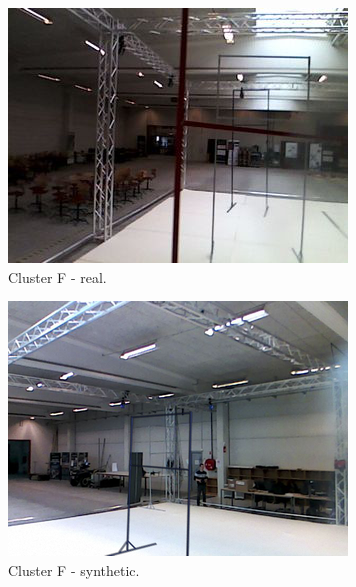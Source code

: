 \begin{figure}[h!]
   \begin{subfigure}{0.32\textwidth}
      \includegraphics[width=\textwidth]{figure/tsne_random/F/1.png}
      \caption{Cluster F - real.}
   \end{subfigure}
   \begin{subfigure}{0.32\textwidth}
      \includegraphics[width=\textwidth]{figure/tsne_random/F/9.png}
      \caption{Cluster F - synthetic.}
   \end{subfigure}
   \begin{subfigure}{0.32\textwidth}

\end{subfigure}
\end{figure}
